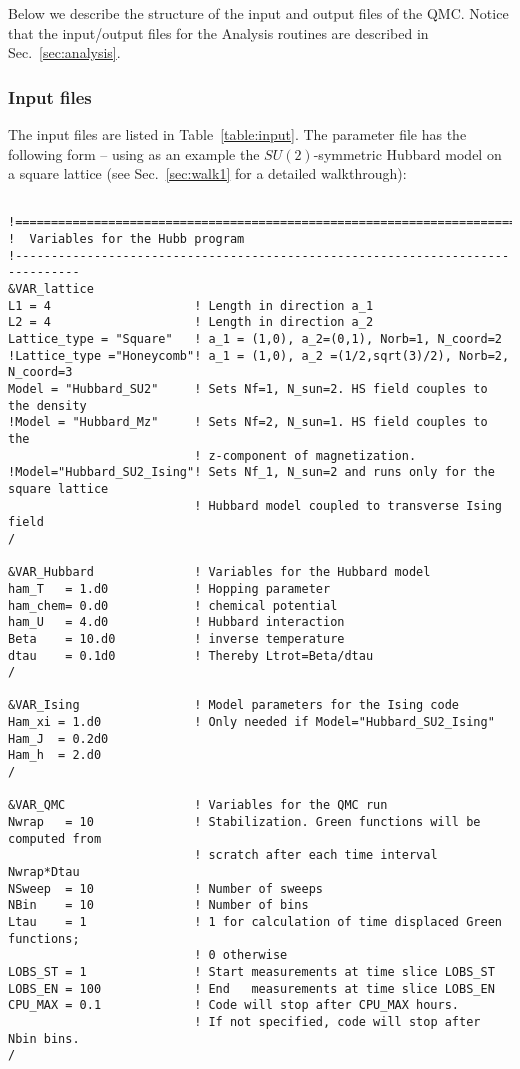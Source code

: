 Below we describe the structure of the input and output files of the QMC. Notice that the input/output files for the Analysis routines are described in Sec.~\ref{sec:analysis}.

\subsubsection{Input files}\label{sec:input}
%

The input files are listed in Table~\ref{table:input}. 
The parameter file  has the following form --
using as an example  the $SU(2)$-symmetric Hubbard model on a square lattice (see Sec.~\ref{sec:walk1} for a detailed walkthrough):
%
\begin{lstlisting}[style=fortran]

!===============================================================================
!  Variables for the Hubb program
!-------------------------------------------------------------------------------
&VAR_lattice
L1 = 4                    ! Length in direction a_1
L2 = 4                    ! Length in direction a_2
Lattice_type = "Square"	  ! a_1 = (1,0), a_2=(0,1), Norb=1, N_coord=2
!Lattice_type ="Honeycomb"! a_1 = (1,0), a_2 =(1/2,sqrt(3)/2), Norb=2, N_coord=3
Model = "Hubbard_SU2"     ! Sets Nf=1, N_sun=2. HS field couples to the density
!Model = "Hubbard_Mz"     ! Sets Nf=2, N_sun=1. HS field couples to the 
                          ! z-component of magnetization.  
!Model="Hubbard_SU2_Ising"! Sets Nf_1, N_sun=2 and runs only for the square lattice
                          ! Hubbard model coupled to transverse Ising field
/

&VAR_Hubbard              ! Variables for the Hubbard model
ham_T   = 1.d0            ! Hopping parameter
ham_chem= 0.d0            ! chemical potential
ham_U   = 4.d0            ! Hubbard interaction
Beta    = 10.d0           ! inverse temperature
dtau    = 0.1d0           ! Thereby Ltrot=Beta/dtau
/

&VAR_Ising                ! Model parameters for the Ising code
Ham_xi = 1.d0             ! Only needed if Model="Hubbard_SU2_Ising"
Ham_J  = 0.2d0
Ham_h  = 2.d0
/

&VAR_QMC                  ! Variables for the QMC run
Nwrap   = 10              ! Stabilization. Green functions will be computed from 
                          ! scratch after each time interval Nwrap*Dtau
NSweep  = 10              ! Number of sweeps
NBin    = 10              ! Number of bins
Ltau    = 1               ! 1 for calculation of time displaced Green functions;
                          ! 0 otherwise
LOBS_ST = 1               ! Start measurements at time slice LOBS_ST
LOBS_EN = 100             ! End   measurements at time slice LOBS_EN
CPU_MAX = 0.1             ! Code will stop after CPU_MAX hours. 
                          ! If not specified, code will stop after Nbin bins.
/


\end{lstlisting}
